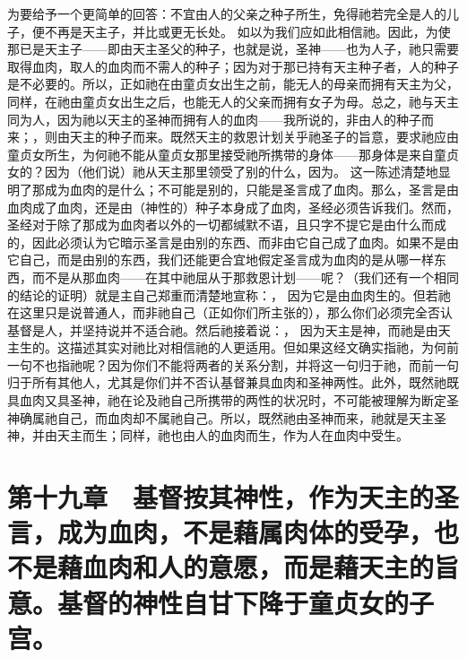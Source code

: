 为要给予一个更简单的回答：不宜由人的父亲之种子所生，免得祂若完全是人的儿子，便不再是天主子，并比或更无长处。 如以为我们应如此相信祂。因此，为使那已是天主子——即由天主圣父的种子，也就是说，圣神——也为人子，祂只需要取得血肉，取人的血肉而不需人的种子；因为对于那已持有天主种子者，人的种子是不必要的。所以，正如祂在由童贞女出生之前，能无人的母亲而拥有天主为父，同样，在祂由童贞女出生之后，也能无人的父亲而拥有女子为母。总之，祂与天主同为人，因为祂以天主的圣神而拥有人的血肉——我所说的，非由人的种子而来；，则由天主的种子而来。既然天主的救恩计划关乎祂圣子的旨意，要求祂应由童贞女所生，为何祂不能从童贞女那里接受祂所携带的身体——那身体是来自童贞女的？因为（他们说）祂从天主那里领受了别的什么，因为。 这一陈述清楚地显明了那成为血肉的是什么；不可能是别的，只能是圣言成了血肉。那么，圣言是由血肉成了血肉，还是由（神性的）种子本身成了血肉，圣经必须告诉我们。然而，圣经对于除了那成为血肉者以外的一切都缄默不语，且只字不提它是由什么而成的，因此必须认为它暗示圣言是由别的东西、而非由它自己成了血肉。如果不是由它自己，而是由别的东西，我们还能更合宜地假定圣言成为血肉的是从哪一样东西，而不是从那血肉——在其中祂屈从于那救恩计划——呢？（我们还有一个相同的结论的证明）就是主自己郑重而清楚地宣称：， 因为它是由血肉生的。但若祂在这里只是说普通人，而非祂自己（正如你们所主张的），那么你们必须完全否认基督是人，并坚持说并不适合祂。然后祂接着说：， 因为天主是神，而祂是由天主生的。这描述其实对祂比对相信祂的人更适用。但如果这经文确实指祂，为何前一句不也指祂呢？因为你们不能将两者的关系分割，并将这一句归于祂，而前一句归于所有其他人，尤其是你们并不否认基督兼具血肉和圣神两性。此外，既然祂既具血肉又具圣神，祂在论及祂自己所携带的两性的状况时，不可能被理解为断定圣神确属祂自己，而血肉却不属祂自己。所以，既然祂由圣神而来，祂就是天主圣神，并由天主而生；同样，祂也由人的血肉而生，作为人在血肉中受生。\par


\section{第十九章　基督按其神性，作为天主的圣言，成为血肉，不是藉属肉体的受孕，也不是藉血肉和人的意愿，而是藉天主的旨意。基督的神性自甘下降于童贞女的子宫。}

